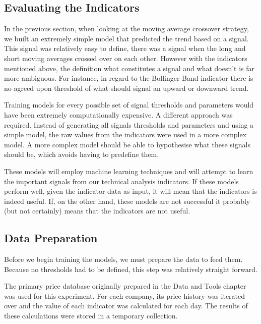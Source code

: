 \documentclass{report}
\begin{document}
\subsection{Evaluating the Indicators}

In the previous section, when looking at the moving average crossover strategy, we built an extremely simple model that predicted the trend based on a signal. This signal was relatively easy to define, there was a signal when the long and short moving averages crossed over on each other. However with the indicators mentioned above, the definition what constitutes a signal and what doesn't is far more ambiguous. For instance, in regard to the Bollinger Band indicator there is no agreed upon threshold of what should signal an upward or downward trend. 

Training models for every possible set of signal thresholds and parameters would have been extremely computationally expensive. A different approach was required. Instead of generating all signals thresholds and parameters and using a simple model, the raw values from the indicators were used in a more complex model. A more complex model should be able to hypothesise what these signals should be, which avoids having to predefine them.

These models will employ machine learning techniques and will attempt to learn the important signals from our technical analysis indicators. If these models perform well, given the indicator data as input, it will mean that the indicators is indeed useful. If, on the other hand, these models are not successful it probably (but not certainly) means that the indicators are not useful. 

\subsection{Data Preparation}

Before we begin training the models, we must prepare the data to feed them. Because no thresholds had to be defined, this step was relatively straight forward. 

The primary price database originally prepared in the Data and Tools chapter was used for this experiment. For each company, its price history was iterated over and the value of each indicator was calculated for each day. The results of these calculations were stored in a temporary collection. 
\end{document}
